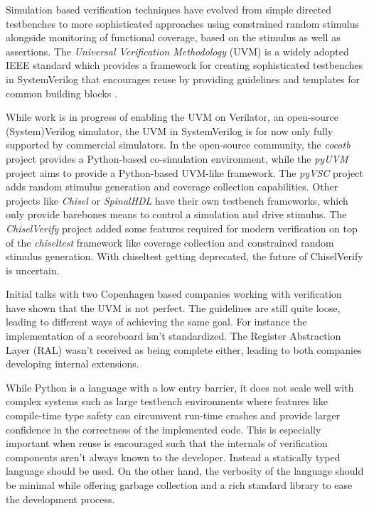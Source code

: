\documentclass[11pt]{article}
\begin{document}
Simulation based verification techniques have evolved from simple directed testbenches to more sophisticated approaches using constrained random stimulus alongside monitoring of functional coverage, based on the stimulus as well as assertions. 
The \textit{Universal Verification Methodology} (UVM) is a widely adopted IEEE standard which provides a framework for creating sophisticated testbenches in SystemVerilog that encourages reuse by providing guidelines and templates for common building blocks \cite{flake2020a}. 

While work is in progress of enabling the UVM on Verilator, an open-source (System)Verilog simulator, the UVM in SystemVerilog is for now only fully supported by commercial simulators.
In the open-source community, the \textit{cocotb} project provides a Python-based co-simulation environment, while the \textit{pyUVM} project aims to provide a Python-based UVM-like framework. The \textit{pyVSC} project adds random stimulus generation and coverage collection capabilities. Other projects like \textit{Chisel} or \textit{SpinalHDL} have their own testbench frameworks, which only provide barebones means to control a simulation and drive stimulus. The \textit{ChiselVerify} project added some features required for modern verification on top of the \textit{chiseltest} framework like coverage collection and constrained random stimulus generation. With chiseltest getting deprecated, the future of ChiselVerify is uncertain.

Initial talks with two Copenhagen based companies working with verification have shown that the UVM is not perfect. The guidelines are still quite loose, leading to different ways of achieving the same goal. For instance the implementation of a scoreboard isn't standardized. The Register Abstraction Layer (RAL) wasn't received as being complete either, leading to both companies developing internal extensions.

While Python is a language with a low entry barrier, it does not scale well with complex systems such as large testbench environments where features like compile-time type safety can circumvent run-time crashes and provide larger confidence in the correctness of the implemented code. This is especially important when reuse is encouraged such that the internals of verification components aren't always known to the developer. Instead a statically typed language should be used. On the other hand, the verbosity of the language should be minimal while offering garbage collection and a rich standard library to ease the development process. 
\end{document}
